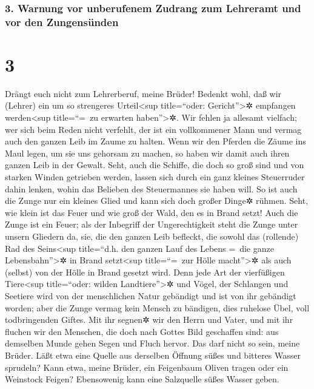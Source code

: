 \hypertarget{warnung-vor-unberufenem-zudrang-zum-lehreramt-und-vor-den-zungensuxfcnden}{%
\subsubsection{3. Warnung vor unberufenem Zudrang zum Lehreramt und vor
den
Zungensünden}\label{warnung-vor-unberufenem-zudrang-zum-lehreramt-und-vor-den-zungensuxfcnden}}

\hypertarget{section-2}{%
\section{3}\label{section-2}}

 Drängt euch nicht zum Lehrerberuf, meine Brüder! Bedenkt
wohl, daß wir (Lehrer) ein um so strengeres Urteil\textless sup
title=``oder: Gericht''\textgreater✲ empfangen werden\textless sup
title=``=~zu erwarten haben''\textgreater✲.  Wir fehlen ja
allesamt vielfach; wer sich beim Reden nicht verfehlt, der ist ein
vollkommener Mann und vermag auch den ganzen Leib im Zaume zu halten.
 Wenn wir den Pferden die Zäume ins Maul legen, um sie uns
gehorsam zu machen, so haben wir damit auch ihren ganzen Leib in der
Gewalt.  Seht, auch die Schiffe, die doch so groß sind und
von starken Winden getrieben werden, lassen sich durch ein ganz kleines
Steuerruder dahin lenken, wohin das Belieben des Steuermannes sie haben
will.  So ist auch die Zunge nur ein kleines Glied und
kann sich doch großer Dinge✲ rühmen. Seht, wie klein ist das Feuer und
wie groß der Wald, den es in Brand setzt!  Auch die Zunge
ist ein Feuer; als der Inbegriff der Ungerechtigkeit steht die Zunge
unter unsern Gliedern da, sie, die den ganzen Leib befleckt, die sowohl
das (rollende) Rad des Seins\textless sup title=``d.h. den ganzen Lauf
des Lebens =~die ganze Lebensbahn''\textgreater✲ in Brand
setzt\textless sup title=``=~zur Hölle macht''\textgreater✲ als auch
(selbst) von der Hölle in Brand gesetzt wird.  Denn jede
Art der vierfüßigen Tiere\textless sup title=``oder: wilden
Landtiere''\textgreater✲ und Vögel, der Schlangen und Seetiere wird von
der menschlichen Natur gebändigt und ist von ihr gebändigt worden;
 aber die Zunge vermag kein Mensch zu bändigen, dies
ruhelose Übel, voll todbringenden Giftes.  Mit ihr segnen✲
wir den Herrn und Vater, und mit ihr fluchen wir den Menschen, die doch
nach Gottes Bild geschaffen sind:  aus demselben Munde
gehen Segen und Fluch hervor. Das darf nicht so sein, meine Brüder.
 Läßt etwa eine Quelle aus derselben Öffnung süßes und
bitteres Wasser sprudeln?  Kann etwa, meine Brüder, ein
Feigenbaum Oliven tragen oder ein Weinstock Feigen? Ebensowenig kann
eine Salzquelle süßes Wasser geben.

